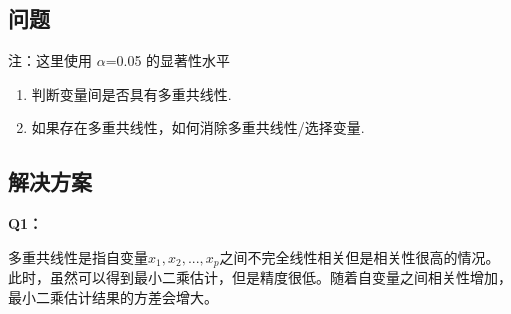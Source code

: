 \documentclass[11pt]{ctexart}
\providecommand{\tightlist}{%
      \setlength{\itemsep}{0pt}\setlength{\parskip}{0pt}}
\begin{document}
    \hypertarget{ux95eeux9898}{%
\subsection{问题}\label{ux95eeux9898}}

注：这里使用 \(\alpha\)=0.05 的显著性水平

\begin{enumerate}
\def\labelenumi{\arabic{enumi}.}
\tightlist
\item
  判断变量间是否具有多重共线性.
\item
  如果存在多重共线性，如何消除多重共线性/选择变量.
\end{enumerate}

\hypertarget{ux89e3ux51b3ux65b9ux6848}{%
\subsection{解决方案}\label{ux89e3ux51b3ux65b9ux6848}}

    \textbf{Q1：}

多重共线性是指自变量\(x_1, x_2, ... ,x_p\)之间不完全线性相关但是相关性很高的情况。此时，虽然可以得到最小二乘估计，但是精度很低。随着自变量之间相关性增加，最小二乘估计结果的方差会增大。
\end{document}
